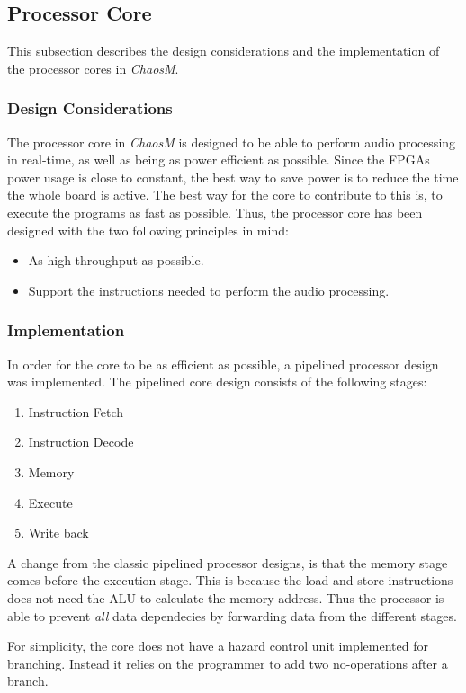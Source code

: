 
\FloatBarrier
\subsection{Processor Core}\label{subsec:fpga-processor-core}

This subsection describes the design considerations and the implementation of the
 processor cores in \textit{ChaosM}.

\subsubsection{Design Considerations}

The processor core in \textit{ChaosM} is designed to be able to perform audio processing in real-time, as well as being as power efficient as possible.
Since the FPGAs power usage is close to constant, the best way to save power is to reduce the time the whole board is active.
The best way for the core to contribute to this is, to execute the programs as fast as possible.
Thus, the processor core has been designed with the two following principles in mind:

\begin{itemize}
	\item As high throughput as possible.
	\item Support the instructions needed to perform the audio processing.
\end{itemize}

\subsubsection{Implementation}

In order for the core to be as efficient as possible, a pipelined processor
design was implemented. The pipelined core design consists of the following
stages:

\begin{enumerate}
	\item Instruction Fetch \label{stage:if}
	\item Instruction Decode \label{stage:id}
	\item Memory \label{stage:mem}
	\item Execute \label{stage:ex}
	\item Write back \label{stage:wb}
\end{enumerate}

A change from the classic pipelined processor designs, is that the memory stage comes before the execution stage.
This is because the load and store instructions does not need the ALU to calculate the memory address.
Thus the processor is able to prevent \textit{all} data dependecies by forwarding data from the different stages.

For simplicity, the core does not have a hazard control unit implemented for branching.
Instead it relies on the programmer to add two no-operations after a branch.



